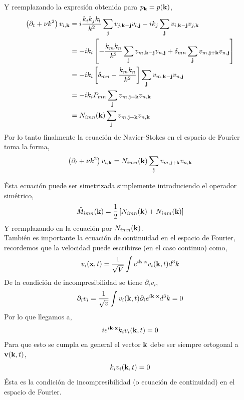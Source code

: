 \documentclass[executivepaper,12pt]{article}
\numberwithin{equation}{section}
\begin{document}
Y reemplazando la expresión obtenida para $p_{\vb{k}}=p(\vb{k})$,
\begin{align*}
	\left(\partial_t +\nu k^2\right)v_{i,\vb{k}}&=i\frac{k_ik_jk_l}{k^2}\sum_{\vb{j}}v_{j,\vb{k-j}}v_{l,\vb{j}}-ik_j\sum_{\vb{j}}v_{i,\vb{k}-\vb{j}}v_{j,\vb{k}}\\
	&=-ik_i\left[-\frac{k_mk_n}{k^2}\sum_{\vb{j}}v_{m,\vb{k-j}}v_{n,\vb{j}}+\delta_{mn}\sum_{\vb{j}}v_{m,\vb{j}+\vb{k}}v_{n,\vb{j}}\right]\\
	&=-ik_i\left[\delta_{mn}-\frac{k_mk_n}{k^2}\right]\sum_{\vb{j}}v_{m,\vb{k}-\vb{j}}v_{n,\vb{j}}\\
	&=-ik_iP_{mn}\sum_{\vb{j}}v_{m,\vb{j}+\vb{k}}v_{n,\vb{k}}\\
	&=N_{imn}(\vb{k})\sum_{\vb{j}}v_{m,\vb{j}+\vb{k}}v_{n,\vb{k}}
\end{align*}
Por lo tanto finalmente la ecuación de Navier-Stokes en el espacio de Fourier toma la forma,
\begin{equation}
\left(\partial_t +\nu k^2\right)v_{i,\vb{k}}=	N_{imn}(\vb{k})\sum_{\vb{j}}v_{m,\vb{j}+\vb{k}}v_{n,\vb{k}} \label{eq.NSF}
\end{equation}

Ésta ecuación puede ser simetrizada simplemente introduciendo el operador simétrico,
\begin{equation*}
	\hat{M}_{imn}(\vb{k})=\frac{1}{2}\left[N_{imn}(\vb{k})+N_{inm}(\vb{k})\right]
\end{equation*}
Y reemplazando en la ecuación por $N_{imn}(\vb{k})$.\\
También es importante la ecuación de continuidad en el espacio de Fourier, recordemos que la velocidad puede escribirse (en el caso continuo) como,
\begin{equation*}
	v_i(\vb{x},t)=\frac{1}{\sqrt{V}}\int e^{i\vb{k}\cdot\vb{x}}v_i(\vb{k},t)d^3k
\end{equation*}
De la condición de incompresibilidad se tiene $\partial_iv_i$,
\begin{equation*}
	\partial_iv_i=\frac{1}{\sqrt{v}}\int v_i(\vb{k},t)\partial_ie^{i\vb{k}\cdot\vb{x}} d^3k=0
\end{equation*}
Por lo que llegamos a,
\begin{equation*}
	ie^{i\vb{k}\cdot\vb{x}} k_iv_i(\vb{k},t) =0
\end{equation*}
Para que esto se cumpla en general  el vector $\vb{k}$ debe ser siempre ortogonal a $\vb{v}(\vb{k},t)$,
\begin{equation*}
	k_iv_i(\vb{k},t)=0
\end{equation*}
Ésta es la condición de incompresibilidad (o ecuación de continuidad) en el espacio de Fourier.
\end{document}
